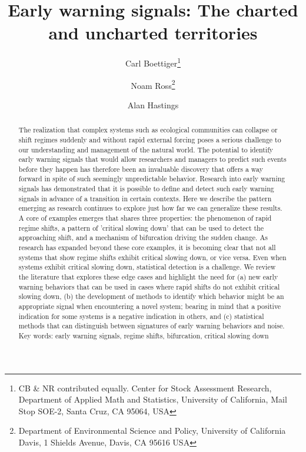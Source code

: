 \documentclass{article}
\title{Early warning signals: The charted and uncharted territories}
\author{%
  Carl Boettiger\thanks{CB \& NR contributed equally. Center for Stock Assessment Research, Department of Applied Math and Statistics, University of California, Mail Stop SOE-2, Santa Cruz, CA 95064, USA} \and Noam Ross\thanks{Department of Environmental Science and Policy, University of California Davis, 1 Shields Avenue, Davis, CA 95616 USA} \and Alan Hastings\footnotemark[2]
}
\begin{document}
  
\maketitle

  \begin{abstract}

The realization that complex systems such as ecological communities can collapse or shift regimes suddenly and without rapid external forcing poses a serious challenge to our understanding and management of the natural world.  The potential to identify early warning signals that would allow researchers and managers to predict such events before they happen has therefore been an invaluable discovery that offers a way forward in spite of such seemingly unpredictable behavior.  Research into early warning signals has demonstrated that it is possible to define and detect such early warning signals in advance of a transition in certain contexts.  Here we describe the pattern emerging as research continues to explore just how far we can generalize these results.  A core of examples emerges that shares three properties: the phenomenon of rapid regime shifts,  a pattern of 'critical slowing down' that can be used to detect the approaching shift, and a mechanism of bifurcation driving the sudden change.  As research has expanded beyond these core examples, it is becoming clear that not all systems that show regime shifts exhibit critical slowing down, or vice versa.  Even when systems exhibit critical slowing down, statistical detection is a challenge.  We review the literature that explores these edge cases and highlight the need for (a) new early warning behaviors that can be used in cases where rapid shifts do not exhibit critical slowing down, (b) the development of methods to identify which behavior might be an appropriate signal when encountering a novel system; bearing in mind that a positive indication for some systems is a negative indication in others, and (c) statistical methods that can distinguish between signatures of early warning behaviors and noise.
\\
Key words: early warning signals, regime shifts, bifurcation, critical slowing down 
\\
\end{abstract}
\end{document}
